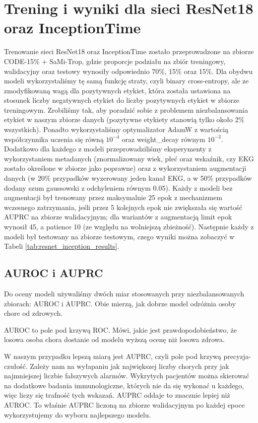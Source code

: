 \section{Trening i wyniki dla sieci ResNet18 oraz InceptionTime}
Trenowanie sieci ResNet18 oraz InceptionTime zostało przeprowadzone na zbiorze CODE-15\% + SaMi-Trop, gdzie proporcje
podziału na zbiór treningowy, walidacyjny oraz testowy wynosiły odpowiednio 70\%, 15\% oraz 15\%.
Dla obydwu modeli wykorzystaliśmy tę samą funkcję straty, czyli binary cross-entropy, ale ze zmodyfikowaną wagą dla
pozytywnych etykiet, która została ustawiona na stosunek liczby negatywnych etykiet do liczby pozytywnych etykiet w zbiorze treningowym.
Zrobiliśmy tak, aby poradzić sobie z problemem niezbalansowania etykiet w naszym zbiorze danych (pozytywne etykiety stanowią tylko około 2\% wszystkich).
Ponadto wykorzystaliśmy optymalizator AdamW z wartością współczynnika uczenia się równą $10^{-4}$ oraz weight\_decay równym $10^{-3}$.
Dodatkowo dla każdego z modeli przeprowadziliśmy eksperymenty z wykorzystaniem metadanych (znormalizowany wiek, płeć oraz wskaźnik, czy EKG
zostało określone w zbiorze jako poprawne) oraz z wykorzystaniem augmentacji danych (w 20\% przypadków wyzerowany jeden kanał EKG, a w 50\% przypadków dodany szum
gaussowski z odchyleniem równym 0.05). Każdy z modeli bez augmentacji był trenowany przez maksymalnie 25 epok
z mechanizmem wczesnego zatrzymania, jeśli przez 5 kolejnych epok nie zwiększała się wartość AUPRC na zbiorze walidacyjnym; dla wariantów z augmentacją limit
epok wynosił 45, a patience 10 (ze względu na wolniejszą zbieżność). Następnie każdy z modeli był testowany na zbiorze testowym, czego wyniki można zobaczyć w Tabeli \ref{tab:resnet_inception_results}.

\subsection{AUROC i AUPRC}
Do oceny modeli używaliśmy dwóch miar stosowanych przy niezbalansowanych zbiorach: AUROC i AUPRC.
Obie mierzą, jak dobrze model odróżnia osoby chore od zdrowych.

AUROC to pole pod krzywą ROC. Mówi, jakie jest prawdopodobieństwo, że losowa osoba chora dostanie
od modelu wyższą ocenę niż losowa zdrowa.

W naszym przypadku lepszą miarą jest AUPRC, czyli pole pod krzywą precyzja-czułość. Zależy nam
na wyłapaniu jak największej liczby chorych przy jak najmniejszej liczbie fałszywych alarmów.
Wykrytych pacjentów można skierować na dodatkowe badania immunologiczne, których nie da się wykonać u każdego,
więc liczy się trafność tych wskazań. AUPRC oddaje to znacznie lepiej niż AUROC. To właśnie AUPRC liczoną
na zbiorze walidacyjnym po każdej epoce wykorzystujemy do wyboru najlepszego modelu.


